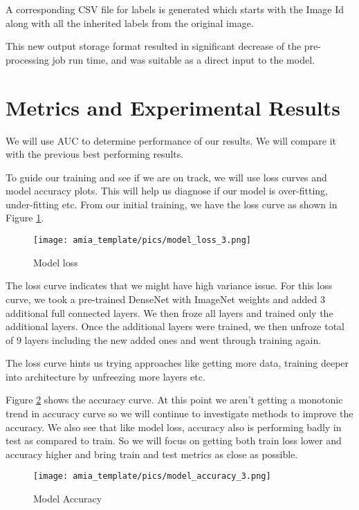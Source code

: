 \documentclass{amia}
\begin{document}
A corresponding CSV file for labels is generated which starts with the Image Id along with all the inherited labels from the original image.

This new output storage format resulted in significant decrease of the pre-processing job run time, and was suitable as a direct input to the model.



\section*{Metrics and Experimental Results}
We will use AUC to determine performance of our results. We will compare it with the previous best performing results.

To guide our training and see if we are on track, we will use loss curves and model accuracy plots. This will help us diagnose if our model is over-fitting, under-fitting etc. From our initial training, we have the loss curve as shown in Figure \ref{fig1}.

\begin{figure}[h!]
\centering
\texttt{[image: amia\_template/pics/model\_loss\_3.png]}
\caption{Model loss}
\label{fig1}
\end{figure}

The loss curve indicates that we might have high variance issue. For this loss curve, we took a pre-trained DenseNet with ImageNet weights and added 3 additional full connected layers. We then froze all layers and trained only the additional layers. Once the additional layers were trained, we then unfroze total of 9 layers including the new added ones and went through training again.

The loss curve hints us trying approaches like getting more data, training deeper into architecture by unfreezing more layers etc.

Figure \ref{fig2} shows the accuracy curve. At this point we aren't getting a monotonic trend in accuracy curve so we will continue to investigate methods to improve the accuracy. We also see that like model loss, accuracy also is performing badly in test as compared to train. So we will focus on getting both train loss lower and accuracy higher and bring train and test metrics as close as possible.

\begin{figure}[h!]
\centering
\texttt{[image: amia\_template/pics/model\_accuracy\_3.png]}
\caption{Model Accuracy}
\label{fig2}
\end{figure}
\end{document}
